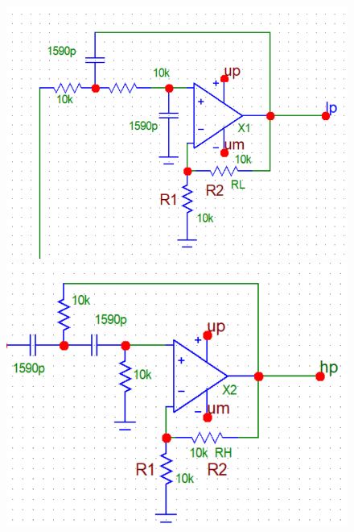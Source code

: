 \documentclass[12pt,a4paper]{article}
\begin{document}
	\begin{figure}[H]
		\centering
		\begin{minipage}[b]{0.33\textwidth}
			\includegraphics[width=1\linewidth]{res/skey_scheme_lp.png}
		\end{minipage}%
		\begin{minipage}[b]{0.33\textwidth}
			\includegraphics[width=1\linewidth]{res/skey_scheme_hp.png}
		\end{minipage}%
		\begin{minipage}[b]{0.33\textwidth}

\end{minipage}
\end{figure}
\end{document}

